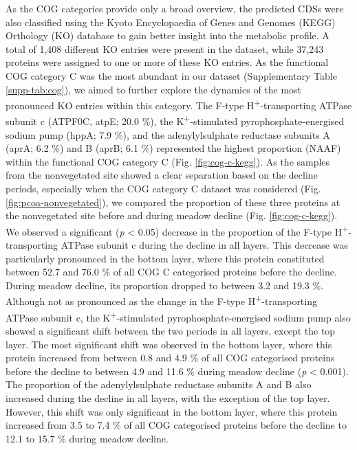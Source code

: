 \documentclass[
  12 pt,
]{article}
\begin{document}
As the COG categories provide only a broad overview, the predicted CDSs were also classified using the Kyoto Encyclopaedia of Genes and Genomes (KEGG) Orthology (KO) database to gain better insight into the metabolic profile. A total of 1,408 different KO entries were present in the dataset, while 37,243 proteins were assigned to one or more of these KO entries. As the functional COG category C was the most abundant in our dataset (Supplementary Table \ref{supp-tab:cog}), we aimed to further explore the dynamics of the most pronounced KO entries within this category. The F-type H\textsuperscript{+}-transporting ATPase subunit c (ATPF0C, atpE; 20.0 \si{\percent}), the K\textsuperscript{+}-stimulated pyrophosphate-energised sodium pump (hppA; 7.9 \si{\percent}), and the adenylylsulphate reductase subunits A (aprA; 6.2 \si{\percent}) and B (aprB; 6.1 \si{\percent}) represented the highest proportion (NAAF) within the functional COG category C (Fig. \ref{fig:cog-c-kegg}). As the samples from the nonvegetated site showed a clear separation based on the decline periods, especially when the COG category C dataset was considered (Fig. \ref{fig:pcoa-nonvegetated}), we compared the proportion of these three proteins at the nonvegetated site before and during meadow decline (Fig. \ref{fig:cog-c-kegg}). We observed a significant (\emph{p} \textless{} 0.05) decrease in the proportion of the F-type H\textsuperscript{+}-transporting ATPase subunit c during the decline in all layers. This decrease was particularly pronounced in the bottom layer, where this protein constituted between 52.7 and 76.0 \si{\percent} of all COG C categorised proteins before the decline. During meadow decline, its proportion dropped to between 3.2 and 19.3 \si{\percent}. Although not as pronounced as the change in the F-type H\textsuperscript{+}-transporting ATPase subunit c, the K\textsuperscript{+}-stimulated pyrophosphate-energised sodium pump also showed a significant shift between the two periods in all layers, except the top layer. The most significant shift was observed in the bottom layer, where this protein increased from between 0.8 and 4.9 \si{\percent} of all COG categorised proteins before the decline to between 4.9 and 11.6 \si{\percent} during meadow decline (\emph{p} \textless{} 0.001). The proportion of the adenylylsulphate reductase subunits A and B also increased during the decline in all layers, with the exception of the top layer. However, this shift was only significant in the bottom layer, where this protein increased from 3.5 to 7.4 \si{\percent} of all COG categorised proteins before the decline to 12.1 to 15.7 \si{\percent} during meadow decline.
\end{document}
